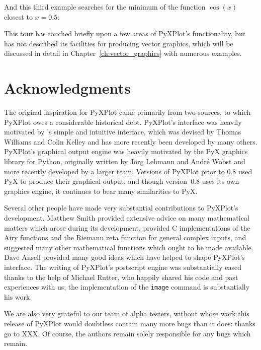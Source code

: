 \noindent And this third example searches for the minimum of the function $\cos(x)$ closest to $x=0.5$:

\vspace{3mm}
\newline
{}\newline
{}\newline
{}
\vspace{3mm}

This tour has touched briefly upon a few areas of PyXPlot's functionality, but
has not described its facilities for producing vector graphics, which will be
discussed in detail in Chapter~\ref{ch:vector_graphics} with numerous examples.

\section{Acknowledgments}

The original inspiration for PyXPlot came primarily from two sources, to which
PyXPlot owes a considerable historical debt.  PyXPlot's interface was heavily
motivated by \gnuplot's simple and intuitive interface, which was devised by
Thomas Williams and Colin Kelley and has more recently been developed by many
others. PyXPlot's graphical output engine was heavily motivated by the
PyX graphics library for Python, originally written by J\"org
Lehmann and Andr\'e Wobst and more recently developed by a larger team.
Versions of PyXPlot prior to $0.8$ used PyX to produce their graphical output,
and though version~$0.8$ uses its own graphics engine, it continues to bear
many similarities to PyX.

Several other people have made very substantial contributions to PyXPlot's
development. Matthew Smith provided extensive advice on many mathematical
matters which arose during its development, provided C implementations of the
Airy functions and the Riemann zeta function for general complex inputs, and
suggested many other mathematical functions which ought to be made available.
Dave Ansell provided many good ideas which have helped to shape PyXPlot's
interface. The writing of PyXPlot's postscript engine was substantially eased
thanks to the help of Michael Rutter, who happily shared his code and past
experiences with us; the implementation of the {\tt image} command is
substantially his work.

We are also very grateful to our team of alpha testers, without whose work this
release of PyXPlot would doubtless contain many more bugs than it does: thanks
go to XXX. Of course, the authors remain solely responsible for any bugs which
remain.

